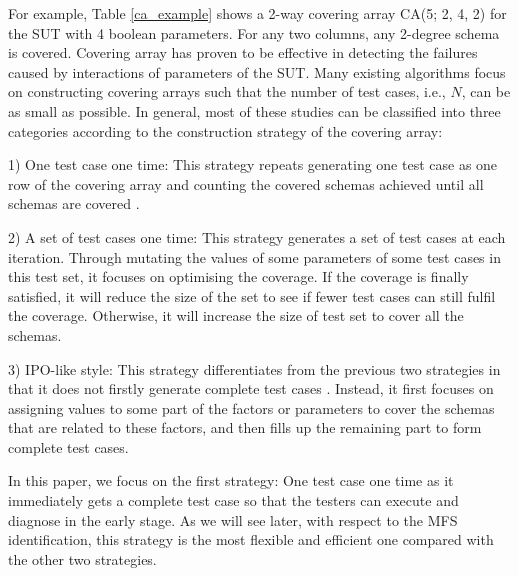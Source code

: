 \documentclass[10pt,journal,compsoc]{IEEEtran}
\begin{document}
For example, Table \ref{ca_example} shows a 2-way covering array CA(5; 2, 4, 2) for the SUT with 4 boolean parameters. For any two columns, any 2-degree schema is covered. Covering array has proven to be effective in detecting the failures caused by interactions of parameters of the SUT. Many existing algorithms focus on constructing covering arrays such that the number of test cases, i.e., $N$, can be as small as possible. In general, most of these studies can be classified into three categories according to the construction strategy of the covering array\cite{nie2011survey}:

1) One test case one time: This strategy repeats generating one test case as one row of the covering array and counting the covered schemas achieved until all schemas are covered \cite{cohen1997aetg,bryce2007density,tung2000automating}.


2) A  set of test cases one time:  This strategy generates a set of test cases at each iteration. Through mutating the values of some parameters of some test cases in this test set, it focuses on optimising the coverage. If the coverage is finally satisfied, it will reduce the size of the set to see if fewer test cases can still fulfil the coverage. Otherwise, it will increase the size of test set to cover all the schemas\cite{cohen2003augmenting,nurmela2004upper}.

3) IPO-like style:  This strategy differentiates from the previous two strategies in that it does not firstly generate complete test cases \cite{lei2008ipog}. Instead, it first focuses on assigning values to some part of the factors or parameters to cover the schemas that are related to these factors, and then fills up the remaining part to form complete test cases.

In this paper, we focus on the first strategy: One test case one time as it immediately gets a complete test case so that the testers can execute and diagnose in the early stage. As we will see later, with respect to the MFS identification, this strategy is the most flexible and efficient one compared with the other two strategies.

%
\end{document}

